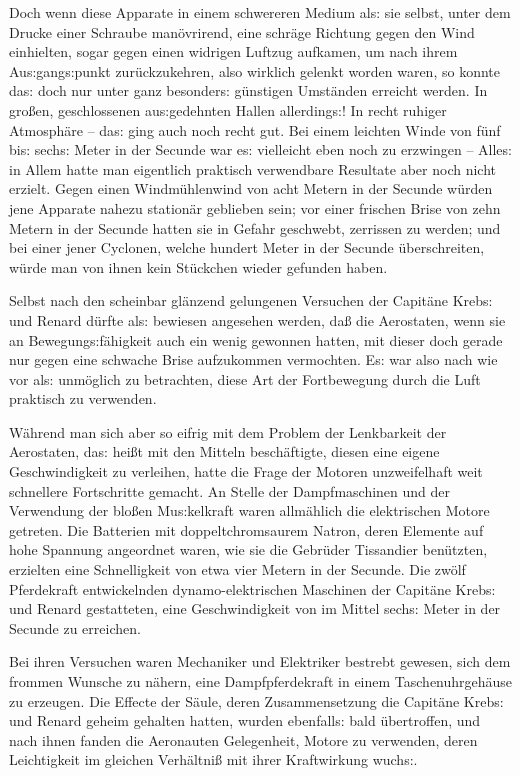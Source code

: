 \documentclass[oneside,12pt]{book}
\newcommand{\s}{s:}
\begin{document}
Doch wenn diese Apparate in einem schwereren Medium al{\s} sie
selbst, unter dem Drucke einer Schraube man\"ovrirend, eine schr\"age
Richtung gegen den Wind einhielten, sogar gegen einen widrigen
Luftzug aufkamen, um nach ihrem Au{\s}gang{\s}punkt zur\"uckzukehren,
also wirklich gelenkt worden waren, so konnte da{\s} doch nur unter
ganz besonder{\s} g\"unstigen Umst\"anden erreicht werden. In
gro{\ss}en, geschlossenen au{\s}gedehnten Hallen allerding{\s}! In
recht ruhiger Atmosph\"are -- da{\s} ging auch noch recht gut. Bei
einem leichten Winde von f\"unf bi{\s} sech{\s} Meter in der Secunde
war e{\s} vielleicht eben noch zu erzwingen -- Alle{\s} in Allem
hatte man eigentlich praktisch verwendbare Resultate aber noch nicht
erzielt. Gegen einen Windm\"uhlenwind von acht Metern in der Secunde
w\"urden jene Apparate nahezu station\"ar geblieben sein; vor einer
frischen Brise von zehn Metern in der Secunde hatten sie in Gefahr
geschwebt, zerrissen zu werden; und bei einer jener Cyclonen, welche
hundert Meter in der Secunde \"uberschreiten, w\"urde man von ihnen
kein St\"uckchen wieder gefunden haben.

Selbst nach den scheinbar gl\"anzend gelungenen Versuchen der
Capit\"ane Kreb{\s} und Renard d\"urfte al{\s} bewiesen angesehen
werden, da{\ss} die Aerostaten, wenn sie an Bewegung{\s}f\"ahigkeit
auch ein wenig gewonnen hatten, mit dieser doch gerade nur gegen eine
schwache Brise aufzukommen vermochten. E{\s} war also nach wie vor
al{\s} unm\"oglich zu betrachten, diese Art der Fortbewegung durch
die Luft praktisch zu verwenden.

W\"ahrend man sich aber so eifrig mit dem Problem der Lenkbarkeit der
Aerostaten, da{\s} hei{\ss}t mit den Mitteln besch\"aftigte, diesen
eine eigene Geschwindigkeit zu verleihen, hatte die Frage der Motoren
unzweifelhaft weit schnellere Fortschritte gemacht. An Stelle der
Dampfmaschinen und der Verwendung der blo{\ss}en Mu{\s}kelkraft waren
allm\"ahlich die elektrischen Motore getreten. Die Batterien mit
doppeltchromsaurem Natron, deren Elemente auf hohe Spannung
angeordnet waren, wie sie die Gebr\"uder Tissandier ben\"utzten,
erzielten eine Schnelligkeit von etwa vier Metern in der Secunde. Die
zw\"olf Pferdekraft entwickelnden dynamo-elektrischen Maschinen der
Capit\"ane Kreb{\s} und Renard gestatteten, eine Geschwindigkeit von
im Mittel sech{\s} Meter in der Secunde zu erreichen.

Bei ihren Versuchen waren Mechaniker und Elektriker bestrebt gewesen,
sich dem frommen Wunsche zu n\"ahern, eine {\glqq}Dampfpferdekraft in
einem Taschenuhrgeh\"ause{\grqq} zu erzeugen. Die Effecte der
S\"aule, deren Zusammensetzung die Capit\"ane Kreb{\s} und Renard
geheim gehalten hatten, wurden ebenfall{\s} bald \"ubertroffen, und
nach ihnen fanden die Aeronauten Gelegenheit, Motore zu verwenden,
deren Leichtigkeit im gleichen Verh\"altni{\ss} mit ihrer
Kraftwirkung wuch{\s}.
\end{document}
